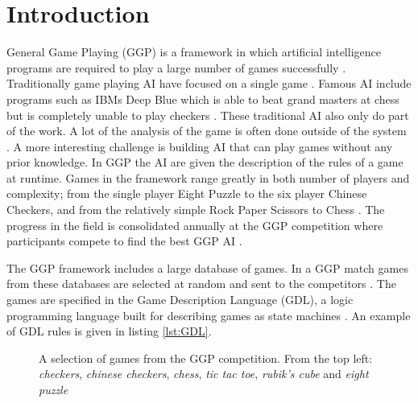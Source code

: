 \chapter{Introduction}\label{ch:intro}
General Game Playing (GGP) is a framework in which artificial intelligence programs are required to play a large number of games successfully \cite{Genesereth/GGPOverview}.
Traditionally game playing AI have focused on a single game \cite{AlphaGo,DeepBlue,Schaeffer/Checkers,Tesauro/Backgammon}. Famous AI include programs such as IBMs Deep Blue which is able to beat grand masters at chess but is completely unable to play checkers \cite{DeepBlue}. These traditional AI also only do part of the work. A lot of the analysis of the game is often done outside of the system \cite{Schaeffer/Checkers}. A more interesting challenge is building AI that can play games without any prior knowledge. In GGP the AI are given the description of the rules of a game at runtime. Games in the framework range greatly in both number of players and complexity; from the single player Eight Puzzle to the six player Chinese Checkers, and from the relatively simple Rock Paper Scissors to Chess  \cite{GGP-Website}. The progress in the field is consolidated annually at the GGP competition where participants compete to find the best GGP AI \cite{Genesereth/GGPOverview}.

The GGP framework includes a large database of games. In a GGP match games from these databases are selected at random and sent to the competitors \cite{Genesereth/GGPOverview}. The games are specified in the Game Description Language (GDL), a logic programming language built for describing games as state machines \cite{GDL_Spec}. An example of GDL rules is given in listing \ref{lst:GDL}.


\begin{figure}[ht]
	\centering
	\caption{A selection of games from the GGP competition. From the top left: \textit{checkers}, \textit{chinese checkers}, \textit{chess}, \textit{tic tac toe}, \textit{rubik's cube} and \textit{eight puzzle}}
\end{figure}



